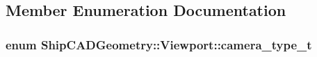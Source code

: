 \subsection{Member Enumeration Documentation}
\hypertarget{classShipCADGeometry_1_1Viewport_ae11090e9e924e7014fdff5111cb93810}{
\subsubsection[{camera\-\_\-type\-\_\-t}]{\setlength{\rightskip}{0pt plus 5cm}enum {\bf Ship\-C\-A\-D\-Geometry\-::\-Viewport\-::camera\-\_\-type\-\_\-t}}}\label{classShipCADGeometry_1_1Viewport_ae11090e9e924e7014fdff5111cb93810}
